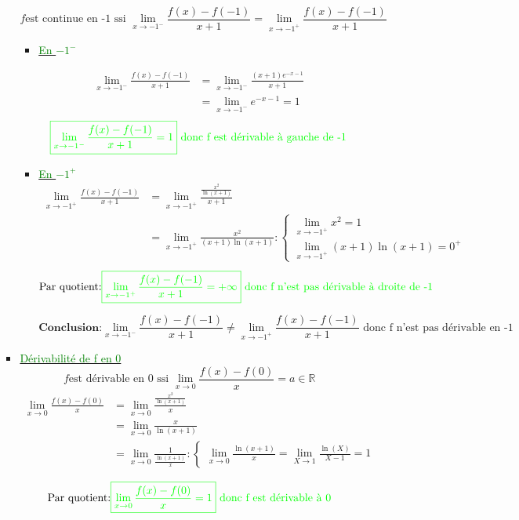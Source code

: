 \documentclass[12pt]{article}
\begin{document}
\begin{enumerate}
\begin{enumerate}
\begin{itemize}
\[f \text{est continue en -1 ssi } \lim_{x \to -1^{-}}\frac{f(x)-f(-1)}{x+1}=\lim_{x \to -1^{+}}\frac{f(x)-f(-1)}{x+1} \]
\begin{itemize}
\item \underline{\textcolor{green}{En $-1^{-}$}}

\begin{align*}
\lim_{x \to -1^{-}}\frac{f(x)-f(-1)}{x+1}&=\lim_{x \to -1^{-}}\frac{(x+1)e^{-x-1}}{x+1}\\
&=\lim_{x \to -1^{-}}e^{-x-1}=1
\end{align*}
\[\textcolor{green}{ \boxed{ \lim_{x \to -1^{-}} \frac{f(x)-f(-1)}{x+1}=1} \text{ donc f est dérivable à gauche de -1} } \]

\item \underline{\textcolor{green}{En $-1^{+}$}}
\begin{align*}
\lim_{x \to -1^{+}}\frac{f(x)-f(-1)}{x+1}&=\lim_{x \to -1^{+}}\frac{\frac{x^{2}}{\ln(x+1)}}{x+1}\\
&=\lim_{x \to -1^{+}}\frac{x^{2}}{(x+1)\ln(x+1)}:
\begin{cases}
\lim_{x \to -1^{+}}x^{2}=1\\
\lim_{x \to -1^{+}}(x+1)\ln(x+1)=0^{+}
\end{cases}
\end{align*}
\[\text{Par quotient:} \textcolor{green}{ \boxed{ \lim_{x \to -1^{+}} \frac{f(x)-f(-1)}{x+1}=+\infty} \text{ donc f n'est pas dérivable à droite de -1} } \]

\[\textbf{Conclusion:} \boxed{ \lim_{x \to -1^{-}} \frac{f(x)-f(-1)}{x+1} \neq \lim_{x \to -1^{+}} \frac{f(x)-f(-1)}{x+1} } \text{ donc f n'est pas dérivable en -1}  \]
\end{itemize}

\item \underline{\textcolor{green}{Dérivabilité de f en 0}}
\[f \text{est dérivable en 0 ssi } \lim_{x \to 0}\frac{f(x)-f(0)}{x}=a\in\mathbb{R}\]
\begin{align*}
\lim_{x \to 0}\frac{f(x)-f(0)}{x}&=\lim_{x \to 0}\frac{\frac{x^{2}}{\ln(x+1)}}{x}\\
&=\lim_{x \to 0}\frac{x}{\ln(x+1)}\\
&=\lim_{x \to 0}\frac{1}{\frac{\ln(x+1)}{x}}:
\begin{cases}
\lim_{x \to 0}\frac{\ln(x+1)}{x}=\lim_{X \to 1}\frac{\ln(X)}{X-1}=1
\end{cases}
\end{align*}

\[\text{Par quotient:} \textcolor{green}{ \boxed{ \lim_{x \to 0}\frac{f(x)-f(0)}{x}=1} \text{ donc f est dérivable à 0} } \]


\end{itemize}
\end{enumerate}
\end{enumerate}
\end{document}
